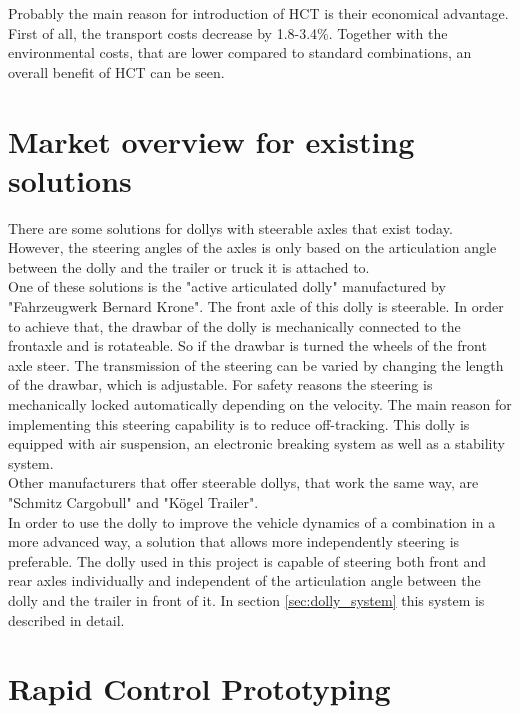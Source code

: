 \documentclass[ExampleMasters.tex]{subfiles}
\begin{document}
Probably the main reason for introduction of HCT is their economical advantage. First of all, the transport costs decrease by 1.8-3.4\%. Together with the environmental costs, that are lower compared to standard combinations, an overall benefit of HCT can be seen.\cite{EMS}


\section{Market overview for existing solutions}
\label{sec:market_overview}
There are some solutions for dollys with steerable axles that exist today. However, the steering angles of the axles is only based on the articulation angle between the dolly and the trailer or truck it is attached to. \\
One of these solutions is the "active articulated dolly" manufactured by "Fahrzeugwerk Bernard Krone". The front axle of this dolly is steerable. In order to achieve that, the drawbar of the dolly is mechanically connected to the frontaxle and is rotateable. So if the drawbar is turned the wheels of the front axle steer. The transmission of the steering can be varied by changing the length of the drawbar, which is adjustable. For safety reasons the steering is mechanically locked automatically depending on the velocity. The main reason for implementing this steering capability is to reduce off-tracking. This dolly is equipped with air suspension, an electronic breaking system as well as a stability system. \cite{Krone_dolly} \\
Other manufacturers that offer steerable dollys, that work the same way, are "Schmitz Cargobull" and "K{\"o}gel Trailer". \cite{Kogel_dolly}\cite{Schmitz_dolly} \\
In order to use the dolly to improve the vehicle dynamics of a  combination in a more advanced way, a solution that allows more independently steering is preferable. The dolly used in this project is capable of steering both front and rear axles individually and independent of the articulation angle between the dolly and the trailer in front of it. In section \ref{sec:dolly_system} this system is described in detail.


\section{Rapid Control Prototyping}
\label{sec:rapid_proto}
\end{document}
